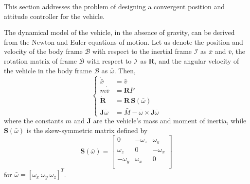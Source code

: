 
This section addresses the problem of designing a convergent position
and attitude controller for the vehicle.

The dynamical model of the vehicle, in the absence of gravity, can be
derived from the Newton and Euler equations of motion. Let us denote the position and velocity of the
body frame $\mathcal{B}$ with respect to the inertial frame
$\mathcal{I}$ as $\bar{x}$ and $\bar{v}$, the rotation matrix of frame
$\mathcal{B}$ with respect to $\mathcal{I}$ as $\mathbf{R}$, and the
angular velocity of the vehicle in the body frame $\mathcal{B}$ as
$\bar{\omega}$. Then,
\begin{equation}
  \label{eq:dynsys}
  \left\{
    \begin{aligned}
      \dot{\bar{x}} &= \bar{v} \\
      m \dot{\bar{v}} &= \mathbf{R} \bar{F} \\
      \dot{\mathbf{R}} &= \mathbf{R}\,\mathbf{S}(\bar{\omega}) \\
      \mathbf{J} \dot{\bar{\omega}} &= \bar{M} - \bar{\omega}\times\mathbf{J} \bar{\omega}
    \end{aligned}
  \right.
\end{equation}
where the constants $m$ and $\mathbf{J}$
are the vehicle's mass and moment of inertia, while
$\mathbf{S}(\bar{\omega})$ is the skew-symmetric matrix defined by
\begin{equation}
  \label{eq:S}
  \mathbf{S}(\bar{\omega}) =
  \left[
    \begin{array}{ccc}
      0 & -\omega_z & \omega_y \\
      \omega_z & 0 & -\omega_x \\
      -\omega_y & \omega_x & 0 \\
    \end{array}
  \right]
\end{equation}
for $\bar{\omega}=[\omega_x\:\omega_y\:\omega_z]^T$.

